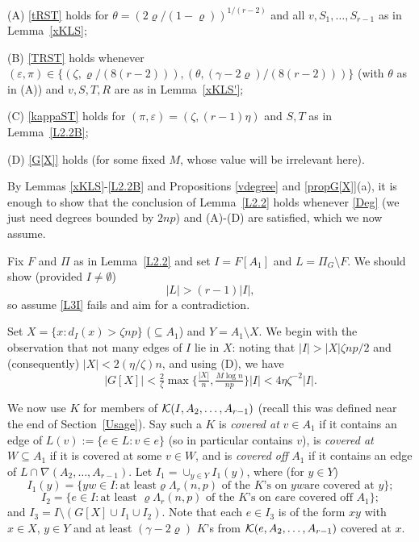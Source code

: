 \documentclass[letterpaper,11pt]{article}
\newcommand{\beq}[1]{\begin{equation}\label{#1}}
\newcommand{\enq}[0]{\end{equation}}
\newcommand{\mn}[0]{\medskip\noindent}
\newcommand{\sub}[0]{\subseteq}
\newcommand{\sm}[0]{\setminus}
\renewcommand{\dots}[0]{,\ldots,}
\newcommand{\K}[0]{{\cal K}}
\newcommand{\0}[0]{\emptyset}
\newcommand{\gc}[0]{\gamma }
\newcommand{\gL}[0]{\Lambda}
\newcommand{\gz}[0]{\zeta}
\newcommand{\eps}[0]{\varepsilon }
\newcommand{\vr}[0]{\varrho}
\newcommand{\glr}[0]{\gL_r(n,p)}
\begin{document}
\mn
(A)  \eqref{tRST} holds for $\theta = (2\vr/(1-\vr))^{1/(r-2)}$
and all $v,S_1\dots S_{r-1}$
as in Lemma~\ref{xKLS};

\mn
(B)  \eqref{TRST} holds whenever
$(\eps,\pi)\in \{(\gz,\vr/(8(r-2))),
(\theta,(\gc-2\vr)/(8(r-2)))\}$ (with $\theta$ as in (A))
and $v,S,T,R$ are
as in Lemma~\ref{xKLS'};

\mn
(C)  \eqref{kappaST} holds for $(\pi,\eps) = (\gz,(r-1)\eta)$
and $S,T$
as in Lemma~\ref{L2.2B};

\mn
(D)  \eqref{G[X]} holds (for some fixed $M$, whose value will
be irrelevant here).

\mn
By Lemmas \ref{xKLS}-\ref{L2.2B} and Propositions \ref{vdegree} and \ref{propG[X]}(a),
it is enough to show that
the conclusion of Lemma~\ref{L2.2} holds whenever \eqref{Deg}
(we just need degrees bounded by $2np$) and
(A)-(D) are satisfied, which we now assume.

\medskip
Fix $F$ and $\Pi$ as in Lemma~\ref{L2.2} and set
$I=F[A_1]$ and $L = \Pi_G\sm F$.
We should show (provided $I\neq \0$)
\beq{L3I}
|L|>(r-1)|I|,
\enq
so assume \eqref{L3I} fails and aim for a
contradiction.

Set
$X =\{x: d_I(x)>\gz np\}$
($\sub A_1$) and $Y=A_1\sm X$.
We begin with the observation that not many edges of $I$
lie in $X$:
noting that $|I|> |X|\gz np/2$ and
(consequently) $|X|< 2(\eta/\gz)n$,
and using (D),
we have
\beq{GX}
|G[X]|
< \tfrac{2}{\gz}\max\{\tfrac{|X|}{n},\tfrac{M\log n}{np}\}|I|
< 4 \eta \gz^{-2}|I|.
\enq



\medskip
We now use $K$ for members of $\K(I,A_2\dots A_{r-1})$
(recall this was defined near the end of Section~\ref{Usage}).
Say such a $K$
is {\em covered at} $v\in A_1$ if it contains
an edge of $L(v):=\{e\in L:v\in e\}$
(so in particular contains $v$),
is {\em covered at} $W\sub A_1$ if it is covered at some $v\in W$,
and is
{\em covered off} $A_1$ if
it contains an edge of $L\cap \nabla(A_2\dots A_{r-1})$.
Let $I_1= \cup_{y\in Y}I_1(y)$, where (for $y\in Y$)
\[
I_1(y) =\{yw\in I: \mbox{at least
$\vr \glr$ of the $K$'s on $yw$
are covered at $y$}\};\]
%
\[I_2=\{e\in I: \mbox{at least $\vr \glr$ of the $K$'s on $e$
are covered off $A_1$}\};\]
and
$I_3= I\sm (G[X]\cup I_1\cup I_2)$.
Note that
each $e\in I_3$ is of the form $xy$ with $x\in X$, $y\in Y$
and at least $(\gc-2\vr)$ $K$'s from $\K(e,A_2\dots A_{r-1})$
covered at $x$.
\end{document}
